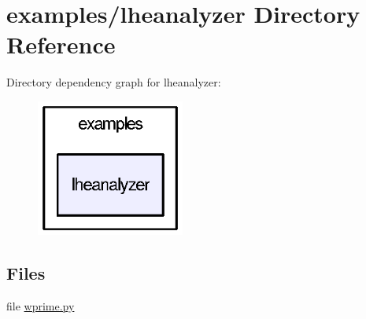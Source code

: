 \section{examples/lheanalyzer Directory Reference}
\label{dir_b7ff8447ec2398feea96196955119396}
Directory dependency graph for lheanalyzer\-:
\nopagebreak
\begin{figure}[H]
\begin{center}
\leavevmode
\includegraphics[width=138pt]{dir_b7ff8447ec2398feea96196955119396_dep}
\end{center}
\end{figure}
\subsection*{Files}
\begin{DoxyCompactItemize}
\item 
file \hyperlink{wprime_8py}{wprime.\-py}
\end{DoxyCompactItemize}
